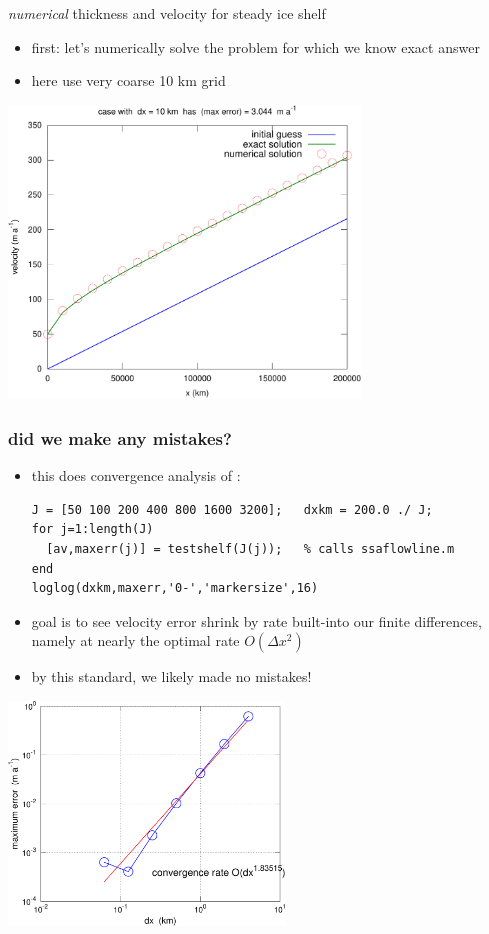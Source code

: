 \begin{frame}{\emph{numerical} thickness and velocity for steady ice shelf}

\begin{itemize}
\item first: let's numerically solve the problem for which we know exact answer
\item here use very coarse 10 km grid
\end{itemize}

\begin{center}
  \includegraphics[width=0.7\textwidth]{photos/shelfnumsoln}
\end{center}
\end{frame}


\begin{frame}[fragile]
  \frametitle{did we make any mistakes?}

\begin{itemize}
\item this does convergence analysis of :

\scriptsize
\begin{verbatim}
J = [50 100 200 400 800 1600 3200];   dxkm = 200.0 ./ J;              
for j=1:length(J)
  [av,maxerr(j)] = testshelf(J(j));   % calls ssaflowline.m
end
loglog(dxkm,maxerr,'0-','markersize',16)
\end{verbatim}
\normalsize
\item goal is to see velocity error shrink by rate built-into our finite differences, namely at nearly the optimal rate $O(\Delta x^2)$
\item by this standard, we likely made no mistakes!
\end{itemize}

\begin{center}
  \includegraphics[width=0.55\textwidth]{photos/shelfconv}
\end{center}
\end{frame}


